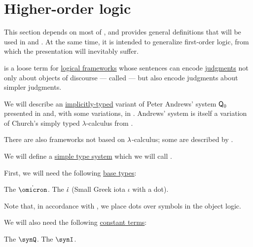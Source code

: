\section{Higher-order logic}\label{sec:higher_order_logic}

This section depends on most of , and provides general definitions that will be used in  and . At the same time, it is intended to generalize first-order logic, from which the presentation will inevitably suffer.

\begin{concept}\label{con:higher_order_logic}
   is a loose term for \hyperref[def:logical_framework]{logical frameworks} whose sentences can encode \hyperref[con:judgment]{judgments} not only about objects of discourse --- called  --- but also encode judgments about simpler judgments.

  We will describe an \hyperref[con:explicit_and_implicit_typing]{implicitly-typed} variant of Peter Andrews' system \( \textsf{Q}_0 \) presented in \cite[\S 51]{Andrews2002STT} and, with some variations, in . Andrews' system is itself a variation of Church's simply typed \( \lambda \)-calculus from \cite{Church1940STT}.

  There are also frameworks not based on \( \mathrm{\lambda} \)-calculus; some are described by .
\end{concept}

\begin{definition}\label{def:simply_typed_hol}\mimprovised
  We will define a \hyperref[def:simple_type_system]{simple type system} which we will call .

  First, we will need the following \hyperref[def:simple_type]{base types}:
  \begin{thmenum}[series=def:simple_type_system/base]
     The  \( \synomicron \).
     The  \( \dot{\iota} \) (Small Greek iota \( \iota \) with a dot).
  \end{thmenum}

  Note that, in accordance with , we place dots over symbols in the object logic.

  We will also need the following \hyperref[def:lambda_term]{constant terms}:
  \begin{thmenum}
     The  \( \synQ \).
     The  \( \synI \).
  \end{thmenum}
\end{definition}
